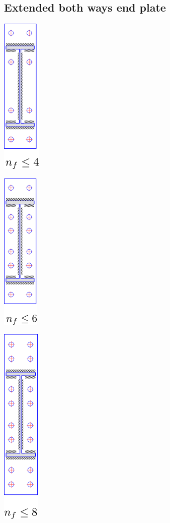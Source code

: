\documentclass[11.5pt,a4paper,oneside]{report}
\begin{document}
\begin{Form}
\subsection{Extended both ways end plate}
	\begin{multicols}{3}
		\begin{center}
			\includegraphics{bolt_layout7.png}
		\end{center}
		\begin{center}
			\includegraphics{bolt_layout8.png}
		\end{center}
		\begin{center}
			\includegraphics{bolt_layout9.png}
		\end{center}
	\end{multicols}


\end{Form}
\end{document}

